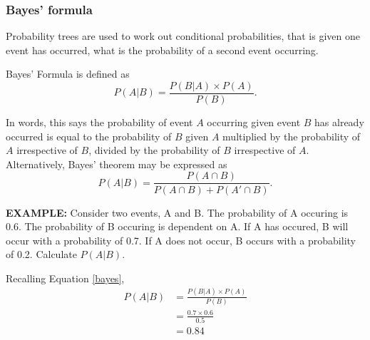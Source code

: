 \documentclass[../notes_compiled.tex]{subfiles}
\begin{document}
\subsubsection{Bayes’ formula}
\begin{itemize}
\item Probability trees are used to work out conditional probabilities, that is given one event has occurred, what is the probability of a second event occurring.
\item Bayes' Formula is defined as 
\begin{equation}
P(A|B) = \frac{P(B|A)\times P(A)}{P(B)}. \label{bayes}
\end{equation}
\item[] In words, this says the probability of event $A$ occurring given event $B$ has already occurred is equal to the probability of $B$ given $A$ multiplied by the probability of $A$ irrespective of $B$, divided by the probability of $B$ irrespective of $A$. Alternatively, Bayes' theorem may be expressed as
\begin{equation}
P(A|B) = \frac{P(A\cap B)}{P(A\cap B)+P(A'\cap B)}.
\end{equation}
{\color{RedViolet}
\item[] \textbf{EXAMPLE:} Consider two events, A and B. The probability of A occuring is 0.6. The probability of B occuring is dependent on A. If A has occured, B will occur with a probability of 0.7. If A does not occur, B occurs with a probability of 0.2. Calculate $P(A|B)$.
}


{\color{RoyalBlue}
Recalling Equation \ref{bayes},
\begin{align*}
P(A|B) &= \frac{P(B|A) \times P(A)}{P(B)} \\
&= \frac{0.7\times0.6}{0.5} \\
&=0.84
\end{align*}
}
\end{itemize}
\end{document}

